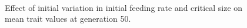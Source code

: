 \begin{figure}[p]
  \\
  \caption{Effect of initial variation in initial feeding rate and critical size on mean trait values at generation 50.}
  \label{fig:ivar_fr_mc}
\end{figure}
